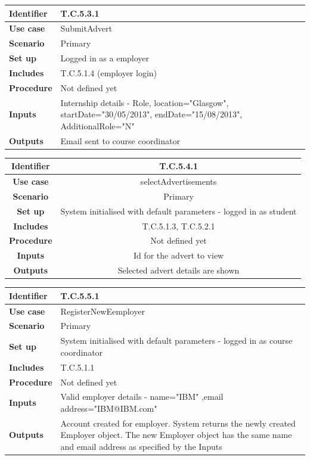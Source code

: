 \documentclass{l3deliverable}
\begin{document}
\begin{tabular}{|p{2cm}|p{12cm}|}
\hline \textbf{Identifier} & T.C.5.3.1\\
\hline \textbf{Use case} & SubmitAdvert\\
\hline \textbf{Scenario} & Primary\\
\hline \textbf{Set up} & Logged in as a employer\\
\hline \textbf{Includes} & T.C.5.1.4 (employer login)\\
\hline \textbf{Procedure} & Not defined yet\\
\hline \textbf{Inputs} & Internship details - Role, location="Glasgow", startDate="30/05/2013", endDate="15/08/2013", AdditionalRole="N"\\
\hline \textbf{Outputs} & Email sent to course coordinator\\
\hline
\end{tabular}

\begin{tabular}{|c|c|}
\hline \textbf{Identifier} & T.C.5.4.1\\
\hline \textbf{Use case} & selectAdvertisements\\
\hline \textbf{Scenario} & Primary\\
\hline \textbf{Set up} & System initialised with default parameters - logged in as student\\
\hline \textbf{Includes} & T.C.5.1.3, T.C.5.2.1\\
\hline \textbf{Procedure} & Not defined yet\\
\hline \textbf{Inputs} & Id for the advert to view\\
\hline \textbf{Outputs} & Selected advert details are shown\\
\hline
\end{tabular}

\begin{tabular}{|p{2cm}|p{12cm}|}
\hline \textbf{Identifier} & T.C.5.5.1\\
\hline \textbf{Use case} & RegisterNewEemployer\\
\hline \textbf{Scenario} & Primary\\
\hline \textbf{Set up} & System initialised with default parameters - logged in as course coordinator\\
\hline \textbf{Includes} & T.C.5.1.1\\
\hline \textbf{Procedure} & Not defined yet\\
\hline \textbf{Inputs} & Valid employer details - name="IBM" ,email address="IBM@IBM.com"\\
\hline \textbf{Outputs} & Account created for employer. System returns the newly created Employer object. The new Employer object has the same name and email address as specified by the Inputs\\
\hline
\end{tabular}
\end{document}
